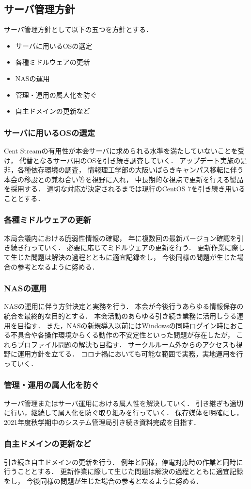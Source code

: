 \subsection*{サーバ管理方針}


サーバ管理方針として以下の五つを方針とする．
\begin{itemize}
    \item サーバに用いるOSの選定
    \item 各種ミドルウェアの更新
    \item NASの運用
    \item 管理・運用の属人化を防ぐ
    \item 自主ドメインの更新など
\end{itemize}

\subsubsection*{サーバに用いるOSの選定}
Cent Streamの有用性が本会サーバに求められる水準を満たしていないことを受け，
代替となるサーバ用のOSを引き続き調査していく．
アップデート実施の是非，各種依存環境の調査，
情報理工学部の大阪いばらきキャンパス移転に伴う本会の移設との兼ね合い等を視野に入れ，
中長期的な視点で更新を行える製品を採用する．
適切な対応が決定されるまでは現行のCentOS 7を引き続き用いることとする．

\subsubsection*{各種ミドルウェアの更新}
本局会議内における脆弱性情報の確認，
年に複数回の最新バージョン確認を引き続き行っていく．
必要に応じてミドルウェアの更新を行う．
更新作業に際して生じた問題は解決の過程とともに適宜記録をし，
今後同様の問題が生じた場合の参考となるように努める．

\subsubsection*{NASの運用}
NASの運用に伴う方針決定と実務を行う．
本会が今後行うあらゆる情報保存の統合を最終的な目的とする．
本会活動のあらゆる引き続き業務に活用しうる運用を目指す．
また，NASの新規導入以前にはWindowsの同時ログイン時におこる不具合や各操作環境からくる動作の不安定性といった問題が存在したが，
これらプロファイル問題の解決も目指す．
サークルルーム外からのアクセスも視野に運用方針を立てる．
コロナ禍においても可能な範囲で実務，実地運用を行っていく．

\subsubsection*{管理・運用の属人化を防ぐ}
サーバ管理またはサーバ運用における属人性を解決していく．
引き継ぎも適切に行い，継続して属人化を防ぐ取り組みを行っていく．
保存媒体を明確にし，2021年度秋学期中のシステム管理局引き続き資料完成を目指す．

\subsubsection*{自主ドメインの更新など}
引き続き自主ドメインの更新を行う．
例年と同様，停電対応時の作業と同時に行うこととする．
更新作業に際して生じた問題は解決の過程とともに適宜記録をし，
今後同様の問題が生じた場合の参考となるように努める．
